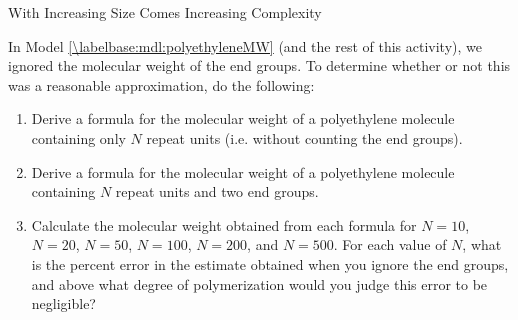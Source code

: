 \begin{activity}{With Increasing Size Comes Increasing Complexity}
\begin{exercises}
	\exercise In Model \ref{\labelbase:mdl:polyethyleneMW} (and the rest of this activity), we ignored the molecular weight of the end groups.  To determine whether or not this was a reasonable approximation, do the following:
	
		\begin{enumerate}
			
			\item Derive a formula for the molecular weight of a polyethylene molecule containing only $N$  repeat units (i.e. without counting the end groups).
			
				\begin{solution}\end{solution}
			
			\item Derive a formula for the molecular weight of a polyethylene molecule containing $N$  repeat units and two  end groups.
			
				\begin{solution}\end{solution}
			
			\item Calculate the molecular weight obtained from each formula for $N=10$, $N=20$, $N=50$, $N=100$, $N=200$, and $N=500$. For each value of $N$, what is the percent error in the estimate obtained when you ignore the end groups, and above what degree of polymerization would you judge this error to be negligible?
			
				\begin{solution}
\end{solution}
\end{enumerate}
\end{exercises}
\end{activity}
